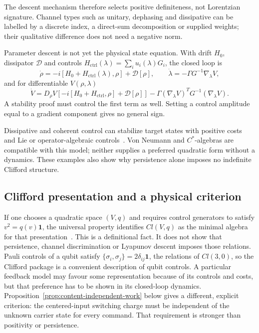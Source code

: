 \documentclass[aps,pre,onecolumn,superscriptaddress,floatfix,longbibliography]{revtex4-2}
\begin{document}
The descent mechanism therefore selects positive definiteness, not Lorentzian signature. Channel types such as unitary, dephasing and dissipative can be labelled by a discrete index, a direct-sum decomposition or supplied weights; their qualitative difference does not need a negative norm.

Parameter descent is not yet the physical state equation. With drift $H_0$, dissipator $\mathcal D$ and controls $H_{\mathrm{ctrl}}(\lambda)=\sum_i u_i(\lambda)G_i$, the closed loop is
\begin{equation}
\dot\rho= -i[H_0+H_{\mathrm{ctrl}}(\lambda),\rho]+\mathcal D[\rho],
\qquad
\dot\lambda=-\Gamma G^{-1}\nabla_\lambda V,
\end{equation}
and for differentiable $V(\rho,\lambda)$
\begin{equation}
\dot V=D_\rho V\!\left[-i[H_0+H_{\mathrm{ctrl}},\rho]+\mathcal D[\rho]\right]
-\Gamma(\nabla_\lambda V)^TG^{-1}(\nabla_\lambda V).
\label{eq:fullVdot}
\end{equation}
A stability proof must control the first term as well. Setting a control amplitude equal to a gradient component gives no general sign.

Dissipative and coherent control can stabilize target states with positive costs and Lie or operator-algebraic controls~\cite{Verstraete2009,Diehl2008,TicozziViola2008,Mirrahimi2005}. Von Neumann and $C^*$-algebras are compatible with this model; neither supplies a preferred quadratic form without a dynamics. These examples also show why persistence alone imposes no indefinite Clifford structure.

\subsection{Clifford presentation and a physical criterion}

If one chooses a quadratic space $(V,q)$ and requires control generators to satisfy $v^2=q(v)\mathbf 1$, the universal property identifies $Cl(V,q)$ as the minimal algebra for that presentation~\cite{Hestenes1966}. This is a definitional fact. It does not show that persistence, channel discrimination or Lyapunov descent imposes those relations. Pauli controls of a qubit satisfy $\{\sigma_i,\sigma_j\}=2\delta_{ij}\mathbf 1$, the relations of $Cl(3,0)$, so the Clifford package is a convenient description of qubit controls. A particular feedback model may favour some representation because of its controls and costs, but that preference has to be shown in its closed-loop dynamics. Proposition~\ref{prop:content-independent-work} below gives a different, explicit criterion: the centered-input switching charge must be independent of the unknown carrier state for every command. That requirement is stronger than positivity or persistence.
\end{document}
